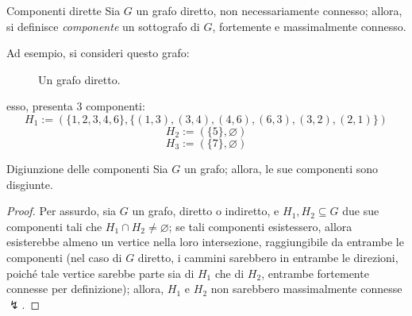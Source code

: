 \documentclass[a4paper, 12pt]{report}
\begin{document}
    \begin{frameddefn}{Componenti dirette}
        Sia $G$ un grafo diretto, non necessariamente connesso; allora, si definisce \textit{componente} un sottografo di $G$, fortemente e massimalmente connesso.
    \end{frameddefn}

    \begin{example}
        Ad esempio, si consideri questo grafo:

        \begin{figure}[H]
            \centering
            \caption{Un grafo diretto.}
        \end{figure}

        esso, presenta $3$ componenti: $$H_1 := (\{1, 2, 3, 4, 6\}, \{(1, 3), (3, 4), (4, 6), (6, 3), (3, 2), (2, 1)\})$$ $$H_2 := (\{5\}, \varnothing)$$ $$H_3 := (\{7\}, \varnothing)$$
    \end{example}

    \begin{framedlem}{Digiunzione delle componenti}
        \label{disjoint comps}
        Sia $G$ un grafo; allora, le sue componenti sono disgiunte.
    \end{framedlem}

    \begin{proof}
        Per assurdo, sia $G$ un grafo, diretto o indiretto, e $H_1, H_2 \subseteq G$ due sue componenti tali che $H_1 \cap H_2 \neq \varnothing$; se tali componenti esistessero, allora esisterebbe almeno un vertice nella loro intersezione, raggiungibile da entrambe le componenti (nel caso di $G$ diretto, i cammini sarebbero in entrambe le direzioni, poiché tale vertice sarebbe parte sia di $H_1$ che di $H_2$, entrambe fortemente connesse per definizione); allora, $H_1$ e $H_2$ non sarebbero massimalmente connesse $\lightning$.
    \end{proof}
\end{document}
